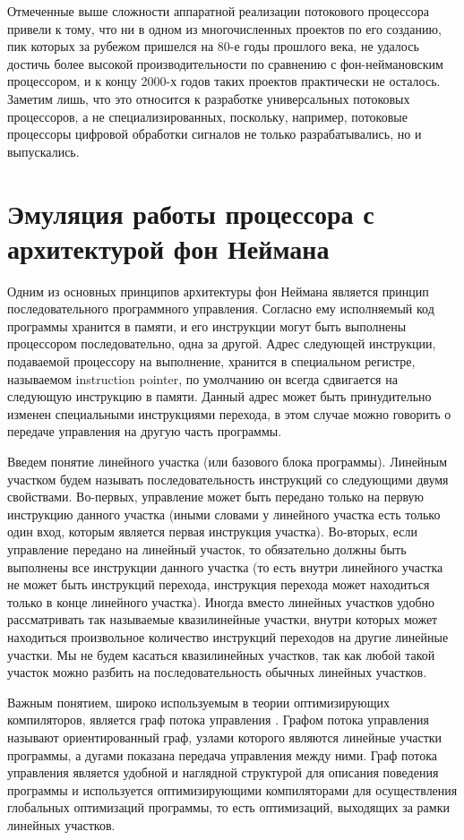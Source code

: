 \documentclass[
11pt,%
tightenlines,%
twoside,%
onecolumn,%
nofloats,%
nobibnotes,%
nofootinbib,%
superscriptaddress,%
noshowpacs,%
centertags]%
{revtex4}
\begin{document}
Отмеченные выше сложности аппаратной реализации потокового процессора привели к тому, что ни в одном из многочисленных проектов по его созданию, пик которых за рубежом пришелся на 80-е годы прошлого века, не удалось достичь более высокой производительности по сравнению с фон-неймановским процессором, и к концу 2000-х годов таких проектов практически не осталось. Заметим лишь, что это относится к разработке универсальных потоковых процессоров, а не специализированных, поскольку, например, потоковые процессоры цифровой обработки сигналов не только разрабатывались, но и выпускались.


\section{Эмуляция работы процессора с архитектурой фон Неймана}

Одним из основных принципов архитектуры фон Неймана является принцип последовательного программного управления.
Согласно ему исполняемый код программы хранится в памяти, и его инструкции могут быть выполнены процессором последовательно, одна за другой.
Адрес следующей инструкции, подаваемой процессору на выполнение, хранится в специальном регистре, называемом instruction pointer, по умолчанию он всегда сдвигается на следующую инструкцию в памяти.
Данный адрес может быть принудительно изменен специальными инструкциями перехода, в этом случае можно говорить о передаче управления на другую часть программы.

Введем понятие линейного участка (или базового блока программы).
Линейным участком будем называть последовательность инструкций со следующими двумя свойствами.
Во-первых, управление может быть передано только на первую инструкцию данного участка (иными словами у линейного участка есть только один вход, которым является первая инструкция участка).
Во-вторых, если управление передано на линейный участок, то обязательно должны быть выполнены все инструкции данного участка (то есть внутри линейного участка не может быть инструкций перехода, инструкция перехода может находиться только в конце линейного участка).
Иногда вместо линейных участков удобно рассматривать так называемые квазилинейные участки, внутри которых может находиться произвольное количество инструкций переходов на другие линейные участки.
Мы не будем касаться квазилинейных участков, так как любой такой участок можно разбить на последовательность обычных линейных участков.

Важным понятием, широко используемым в теории оптимизирующих компиляторов, является граф потока управления \cite{Muchnick}.
Графом потока управления называют ориентированный граф, узлами которого являются линейные участки программы, а дугами показана передача управления между ними.
Граф потока управления является удобной и наглядной структурой для описания поведения программы и используется оптимизирующими компиляторами для осуществления глобальных оптимизаций программы, то есть оптимизаций, выходящих за рамки линейных участков.
\end{document}
